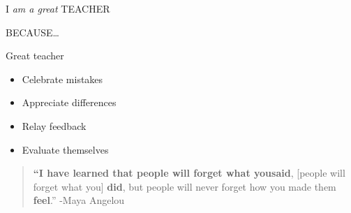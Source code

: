 \documentclass[
  ignorenonframetext,
]{beamer}
\providecommand{\tightlist}{%
  \setlength{\itemsep}{0pt}\setlength{\parskip}{0pt}}\usepackage{longtable,booktabs,array}
\begin{document}
\begin{frame}{}
\protect\hypertarget{section-8}{}
{I \emph{am a great} TEACHER}

{BECAUSE\ldots{}}
\end{frame}

\begin{frame}{Great teacher}
\protect\hypertarget{great-teacher}{}
\begin{itemize}[<+->]
\tightlist
\item
  {Celebrate mistakes}
\item
  {Appreciate differences}
\item
  {Relay feedback}
\item
  {Evaluate themselves}
\end{itemize}

\begin{quote}
\textbf{``{I have learned that people will forget what you}{said}},
{[}people will forget what you{]} {\textbf{did}}, {but people will never
forget how you made them} {\textbf{feel}}.'' -Maya Angelou
\end{quote}
\end{frame}
\end{document}
